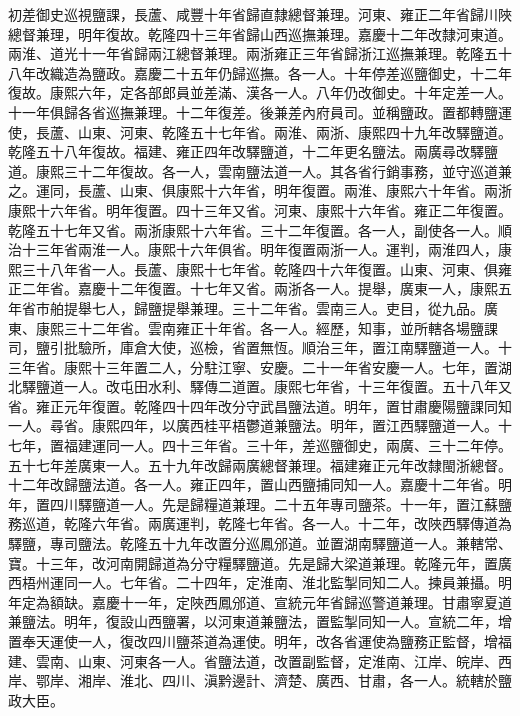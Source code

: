 \begin{pinyinscope}
初差御史巡視鹽課，長蘆、咸豐十年省歸直隸總督兼理。河東、雍正二年省歸川陜總督兼理，明年復故。乾隆四十三年省歸山西巡撫兼理。嘉慶十二年改隸河東道。兩淮、道光十一年省歸兩江總督兼理。兩浙雍正三年省歸浙江巡撫兼理。乾隆五十八年改織造為鹽政。嘉慶二十五年仍歸巡撫。各一人。十年停差巡鹽御史，十二年復故。康熙六年，定各部郎員並差滿、漢各一人。八年仍改御史。十年定差一人。十一年俱歸各省巡撫兼理。十二年復差。後兼差內府員司。並稱鹽政。置都轉鹽運使，長蘆、山東、河東、乾隆五十七年省。兩淮、兩浙、康熙四十九年改驛鹽道。乾隆五十八年復故。福建、雍正四年改驛鹽道，十二年更名鹽法。兩廣尋改驛鹽道。康熙三十二年復故。各一人，雲南鹽法道一人。其各省行銷事務，並守巡道兼之。運同，長蘆、山東、俱康熙十六年省，明年復置。兩淮、康熙六十年省。兩浙康熙十六年省。明年復置。四十三年又省。河東、康熙十六年省。雍正二年復置。乾隆五十七年又省。兩浙康熙十六年省。三十二年復置。各一人，副使各一人。順治十三年省兩淮一人。康熙十六年俱省。明年復置兩浙一人。運判，兩淮四人，康熙三十八年省一人。長蘆、康熙十七年省。乾隆四十六年復置。山東、河東、俱雍正二年省。嘉慶十二年復置。十七年又省。兩浙各一人。提舉，廣東一人，康熙五年省巿舶提舉七人，歸鹽提舉兼理。三十二年省。雲南三人。吏目，從九品。廣東、康熙三十二年省。雲南雍正十年省。各一人。經歷，知事，並所轄各場鹽課司，鹽引批驗所，庫倉大使，巡檢，省置無恆。順治三年，置江南驛鹽道一人。十三年省。康熙十三年置二人，分駐江寧、安慶。二十一年省安慶一人。七年，置湖北驛鹽道一人。改屯田水利、驛傳二道置。康熙七年省，十三年復置。五十八年又省。雍正元年復置。乾隆四十四年改分守武昌鹽法道。明年，置甘肅慶陽鹽課同知一人。尋省。康熙四年，以廣西桂平梧鬱道兼鹽法。明年，置江西驛鹽道一人。十七年，置福建運同一人。四十三年省。三十年，差巡鹽御史，兩廣、三十二年停。五十七年差廣東一人。五十九年改歸兩廣總督兼理。福建雍正元年改隸閩浙總督。十二年改歸鹽法道。各一人。雍正四年，置山西鹽捕同知一人。嘉慶十二年省。明年，置四川驛鹽道一人。先是歸糧道兼理。二十五年專司鹽茶。十一年，置江蘇鹽務巡道，乾隆六年省。兩廣運判，乾隆七年省。各一人。十二年，改陜西驛傳道為驛鹽，專司鹽法。乾隆五十九年改置分巡鳳邠道。並置湖南驛鹽道一人。兼轄常、寶。十三年，改河南開歸道為分守糧驛鹽道。先是歸大梁道兼理。乾隆元年，置廣西梧州運同一人。七年省。二十四年，定淮南、淮北監掣同知二人。揀員兼攝。明年定為額缺。嘉慶十一年，定陜西鳳邠道、宣統元年省歸巡警道兼理。甘肅寧夏道兼鹽法。明年，復設山西鹽署，以河東道兼鹽法，置監掣同知一人。宣統二年，增置奉天運使一人，復改四川鹽茶道為運使。明年，改各省運使為鹽務正監督，增福建、雲南、山東、河東各一人。省鹽法道，改置副監督，定淮南、江岸、皖岸、西岸、鄂岸、湘岸、淮北、四川、滇黔邊計、濟楚、廣西、甘肅，各一人。統轄於鹽政大臣。


\end{pinyinscope}
